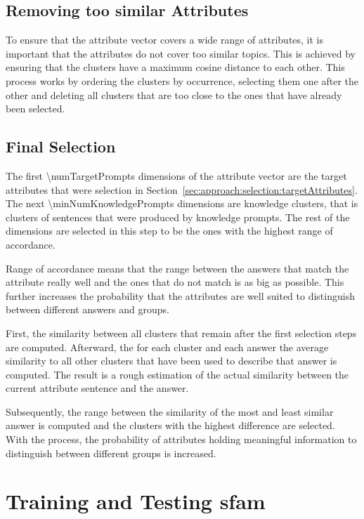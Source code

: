 \subsection{Removing too similar Attributes}
\label{sec:approach:selection:removeSimilar}
To ensure that the attribute vector covers a wide range of attributes, it is important that the attributes do not cover too similar topics. This is achieved by ensuring that the clusters have a maximum cosine distance to each other. This process works by ordering the clusters by occurrence, selecting them one after the other and deleting all clusters that are too close to the ones that have already been selected.

\subsection{Final Selection} %
\label{sec:approach:selection:finalSelection}
The first \num{\numTargetPrompts} dimensions of the attribute vector are the target attributes that were selection in Section~\ref{sec:approach:selection:targetAttributes}. The next \num{\minNumKnowledgePrompts} dimensions are knowledge clusters, that is clusters of sentences that were produced by knowledge prompts. The rest of the dimensions are selected in this step to be the ones with the highest range of accordance. %

Range of accordance means that the range between the answers that match the attribute really well and the ones that do not match is as big as possible. This further increases the probability that the attributes are well suited to distinguish between different answers and groups.

First, the similarity between all clusters that remain after the first selection steps are computed. Afterward, the for each cluster and each answer the average similarity to all other clusters that have been used to describe that answer is computed. The result is a rough estimation of the actual similarity between the current attribute sentence and the answer.

Subsequently, the range between the similarity of the most and least similar answer is computed and the clusters with the highest difference are selected. With the process, the probability of attributes holding meaningful information to distinguish between different groups is increased.


\section{Training and Testing \acs{sfam}}
\label{sec:approach:sfam}

